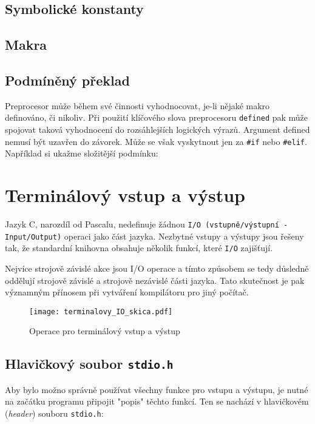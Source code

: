       \subsection{Symbolické konstanty}
      \subsection{Makra}
     
    \subsection{Podmíněný překlad}  
      Preprocesor může během své činnosti vyhodnocovat, je-li nějaké makro definováno, či nikoliv. 
      Při použití klíčového slova preprocesoru \texttt{defined} pak může spojovat taková 
      vyhodnocení do rozsáhlejších logických výrazů. Argument defined nemusí být uzavřen do 
      závorek. Může se však vyskytnout jen za \lstinline[style=luaCStyle]!#if! nebo 
      \lstinline[style=luaCStyle]!#elif!. Například si ukažme složitější podmínku:


  \section{Terminálový vstup a výstup}
    Jazyk C, narozdíl od Pascalu, nedefinuje žádnou \texttt{I/O (vstup\-ně/výstup\-ní 
    -In\-put/Out\-put)} operaci jako část jazyka. Nezbytné vstupy a výstupy jsou řešeny tak, že 
    standardní knihovna obsahuje několik funkcí, které \texttt{I/O} zajišťují.
  
    Nejvíce strojově závislé akce jsou I/O operace a tímto způsobem se tedy důsledně oddělují 
    strojově závislé a strojově nezávislé části jazyka. Tato skutečnost je pak významným přínosem 
    při vytváření kompilátoru pro jiný počítač.
  
    \begin{figure}[ht!]
      \centering
      \texttt{[image: terminalovy\_IO\_skica.pdf]}
      \caption{Operace pro terminálový vstup a výstup}\label{C:fig_Terminal_IO}
    \end{figure}
  
    \subsection{Hlavičkový soubor \texttt{stdio.h}}
      Aby bylo možno správně používat všechny funkce pro vstupu a výstupu, je nutné na začátku 
      programu připojit "popis" těchto funkcí. Ten se nachází v hlavičkovém (\emph{header}) souboru 
      \lstinline[style=luaCStyle]!stdio.h!:
  
